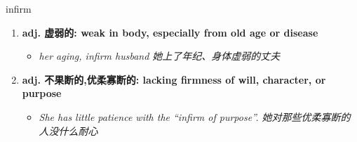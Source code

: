 
\begin{frame}
{\huge infirm}
\begin{center}
\begin{enumerate}\Large
  \item \textbf{adj. 虚弱的: weak in body, especially from old age or disease}
  \begin{itemize}
    \item \em{\Large{her aging, infirm husband 她上了年纪、身体虚弱的丈夫}}
  \end{itemize}
  \item \textbf{adj. 不果断的,优柔寡断的: lacking firmness of will, character, or purpose}
  \begin{itemize}
    \item \em{\Large{She has little patience with the “infirm of purpose”. 她对那些优柔寡断的人没什么耐心}}
  \end{itemize}
\end{enumerate}
\end{center}
\end{frame}
